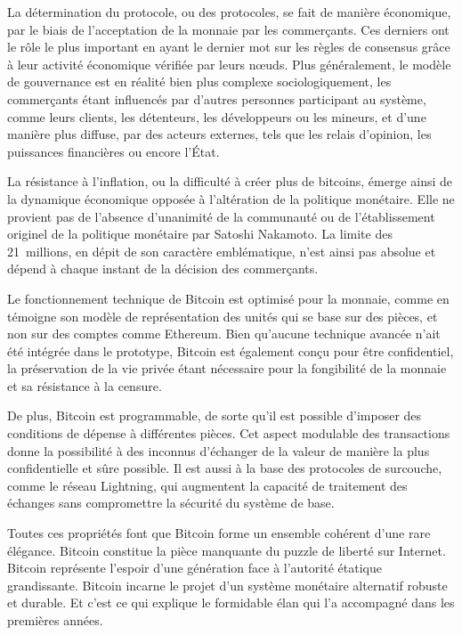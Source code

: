 La détermination du protocole, ou des protocoles, se fait de manière économique, par le biais de l'acceptation de la monnaie par les commerçants. Ces derniers ont le rôle le plus important en ayant le dernier mot sur les règles de consensus grâce à leur activité économique vérifiée par leurs nœuds. Plus généralement, le modèle de gouvernance est en réalité bien plus complexe sociologiquement, les commerçants étant influencés par d'autres personnes participant au système, comme leurs clients, les détenteurs, les développeurs ou les mineurs, et d'une manière plus diffuse, par des acteurs externes, tels que les relais d'opinion, les puissances financières ou encore l'État.

La résistance à l'inflation, ou la difficulté à créer plus de bitcoins, émerge ainsi de la dynamique économique opposée à l'altération de la politique monétaire. Elle ne provient pas de l'absence d'unanimité de la communauté ou de l'établissement originel de la politique monétaire par Satoshi Nakamoto. La limite des 21~millions, en dépit de son caractère emblématique, n'est ainsi pas absolue et dépend à chaque instant de la décision des commerçants.

Le fonctionnement technique de Bitcoin est optimisé pour la monnaie, comme en témoigne son modèle de représentation des unités qui se base sur des pièces, et non sur des comptes comme Ethereum. Bien qu'aucune technique avancée n'ait été intégrée dans le prototype, Bitcoin est également conçu pour être confidentiel, la préservation de la vie privée étant nécessaire pour la fongibilité de la monnaie et sa résistance à la censure.

De plus, Bitcoin est programmable, de sorte qu'il est possible d'imposer des conditions de dépense à différentes pièces. Cet aspect modulable des transactions donne la possibilité à des inconnus d'échanger de la valeur de manière la plus confidentielle et sûre possible. Il est aussi à la base des protocoles de surcouche, comme le réseau Lightning, qui augmentent la capacité de traitement des échanges sans compromettre la sécurité du système de base.

Toutes ces propriétés font que Bitcoin forme un ensemble cohérent d'une rare élégance. Bitcoin constitue la pièce manquante du puzzle de liberté sur Internet. Bitcoin représente l'espoir d'une génération face à l'autorité étatique grandissante. Bitcoin incarne le projet d'un système monétaire alternatif robuste et durable. Et c'est ce qui explique le formidable élan qui l'a accompagné dans les premières années.

